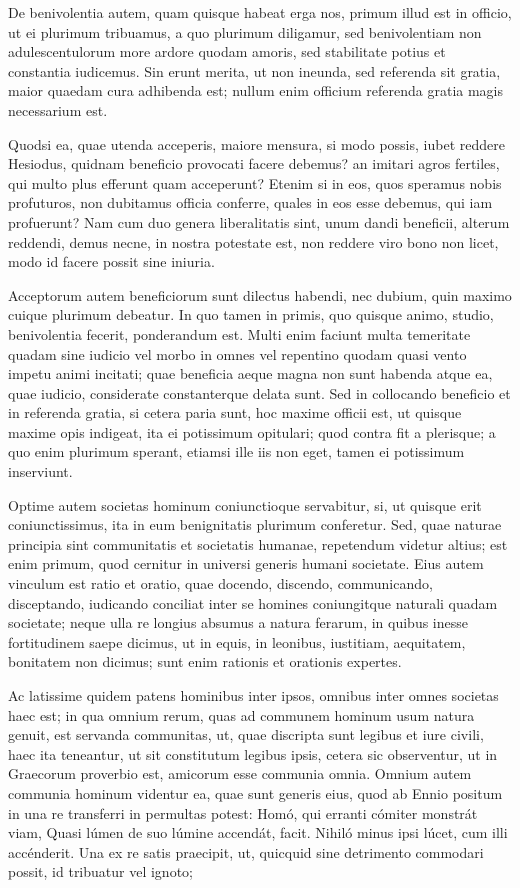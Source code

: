  De benivolentia autem, quam quisque habeat erga nos, primum illud est in officio, ut ei plurimum tribuamus, a quo plurimum diligamur, sed benivolentiam non adulescentulorum more ardore quodam amoris, sed stabilitate potius et constantia iudicemus. Sin erunt merita, ut non ineunda, sed referenda sit gratia, maior quaedam cura adhibenda est; nullum enim officium referenda gratia magis necessarium est.

 Quodsi ea, quae utenda acceperis, maiore mensura, si modo possis, iubet reddere Hesiodus, quidnam beneficio provocati facere debemus? an imitari agros fertiles, qui multo plus efferunt quam acceperunt? Etenim si in eos, quos speramus nobis profuturos, non dubitamus officia conferre, quales in eos esse debemus, qui iam profuerunt? Nam cum duo genera liberalitatis sint, unum dandi beneficii, alterum reddendi, demus necne, in nostra potestate est, non reddere viro bono non licet, modo id facere possit sine iniuria.

 Acceptorum autem beneficiorum sunt dilectus habendi, nec dubium, quin maximo cuique plurimum debeatur. In quo tamen in primis, quo quisque animo, studio, benivolentia fecerit, ponderandum est. Multi enim faciunt multa temeritate quadam sine iudicio vel morbo in omnes vel repentino quodam quasi vento impetu animi incitati; quae beneficia aeque magna non sunt habenda atque ea, quae iudicio, considerate constanterque delata sunt. Sed in collocando beneficio et in referenda gratia, si cetera paria sunt, hoc maxime officii est, ut quisque maxime opis indigeat, ita ei potissimum opitulari; quod contra fit a plerisque; a quo enim plurimum sperant, etiamsi ille iis non eget, tamen ei potissimum inserviunt.

 Optime autem societas hominum coniunctioque servabitur, si, ut quisque erit coniunctissimus, ita in eum benignitatis plurimum conferetur. Sed, quae naturae principia sint communitatis et societatis humanae, repetendum videtur altius; est enim primum, quod cernitur in universi generis humani societate. Eius autem vinculum est ratio et oratio, quae docendo, discendo, communicando, disceptando, iudicando conciliat inter se homines coniungitque naturali quadam societate; neque ulla re longius absumus a natura ferarum, in quibus inesse fortitudinem saepe dicimus, ut in equis, in leonibus, iustitiam, aequitatem, bonitatem non dicimus; sunt enim rationis et orationis expertes.

 Ac latissime quidem patens hominibus inter ipsos, omnibus inter omnes societas haec est; in qua omnium rerum, quas ad communem hominum usum natura genuit, est servanda communitas, ut, quae discripta sunt legibus et iure civili, haec ita teneantur, ut sit constitutum legibus ipsis, cetera sic observentur, ut in Graecorum proverbio est, amicorum esse communia omnia. Omnium autem communia hominum videntur ea, quae sunt generis eius, quod ab Ennio positum in una re transferri in permultas potest: Homó, qui erranti cómiter monstrát viam, Quasi lúmen de suo lúmine accendát, facit. Nihiló minus ipsi lúcet, cum illi accénderit. Una ex re satis praecipit, ut, quicquid sine detrimento commodari possit, id tribuatur vel ignoto;

